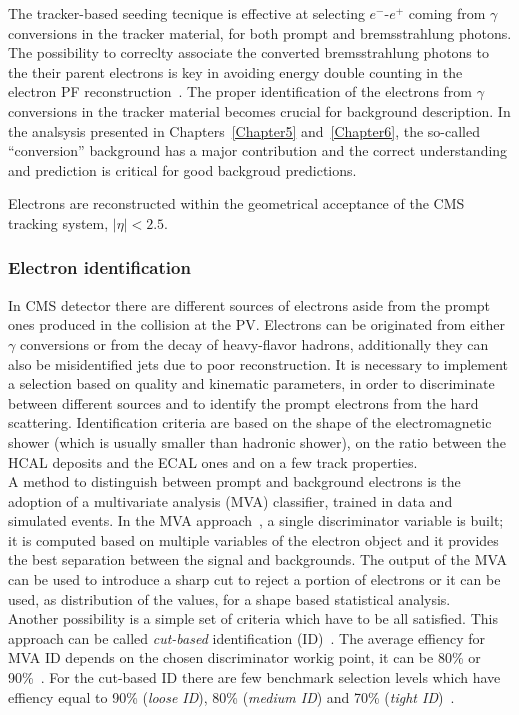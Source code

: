 The tracker-based seeding tecnique is effective at selecting $e^{-}$-$e^{+}$ coming from $\gamma$ conversions
in the tracker material, for both prompt and bremsstrahlung
photons. The possibility to correclty associate the converted
bremsstrahlung photons
to the their parent electrons is key in avoiding energy double
counting in the electron PF reconstruction~\cite{CMS:particleflow}. The proper identification
of the electrons from $\gamma$ conversions
in the tracker material becomes crucial for background description. In
the analsysis presented in
Chapters~\ref{Chapter5} and~\ref{Chapter6}, the so-called
``conversion'' background has a major contribution and the correct
understanding and prediction is critical for good backgroud
predictions.

Electrons are reconstructed within the geometrical acceptance of the
CMS tracking system, $|\eta|<2.5$.

\subsubsection{Electron identification}\label{sec:c2keleid}
In CMS detector there are different sources of electrons aside from the
prompt ones produced in the collision at the PV. Electrons can be
originated from either $\gamma$ conversions or from the decay of heavy-flavor
hadrons, additionally they can also be misidentified jets due to poor
reconstruction. It is necessary to implement a selection based on quality and
kinematic parameters,  in order to discriminate between different 
sources and to identify the
prompt electrons from the hard scattering.
Identification criteria are based on the shape of the electromagnetic shower
(which is usually smaller than hadronic shower), on the ratio between the
HCAL deposits and the ECAL ones and on a few track properties.\\
A method to distinguish between prompt and background
electrons is the adoption of a multivariate
analysis (MVA) classifier, trained in data and simulated events. In the MVA approach~\cite{mvatwiki}, a
single discriminator variable is built; it is computed based on
multiple variables of the electron object and it provides the best
separation between the signal and backgrounds. The output of the MVA
can be used to introduce a sharp cut to reject a portion of electrons
or it can be used, as distribution of the values, for a shape based
statistical analysis.\\
Another possibility is a simple set of criteria which have to be
all satisfied. This approach can be called \emph{cut-based}
identification (ID)~\cite{cutbasedtwiki}. The average effiency for MVA
ID depends on the chosen discriminator workig point, it can be 80\% or
90\%~\cite{mvatwiki}. For the cut-based ID there are few benchmark selection levels
which have effiency equal to 90\% (\emph{loose ID}), 80\% (\emph{medium
  ID}) and 70\% (\emph{tight ID})~\cite{cutbasedtwiki}.


